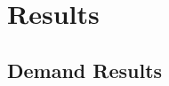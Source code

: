\documentclass[11pt]{article}
\begin{document}

\section{Results}\label{sec:sec_results}
\subsection{Demand Results}
\end{document}
